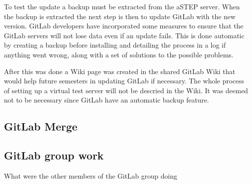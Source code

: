 
To test the update a backup must be extracted from the aSTEP server. %
When the backup is extracted the next step is then to update GitLab with the new version. GitLab developers have incorporated some measures to ensure that the GitLab servers will not lose data even if an update fails. This is done automatic by creating a backup before installing and detailing the process in a log if anything went wrong, along with a set of solutions to the possible problems.

After this was done a Wiki page was created in the shared GitLab Wiki that would help future semesters in updating GitLab if necessary. The whole process of setting up a virtual test server will not be descried in the Wiki. It was deemed not to be necessary since GitLab have an automatic backup feature.

\subsection{GitLab Merge}

\subsection{GitLab group work}
What were the other members of the GitLab group doing

